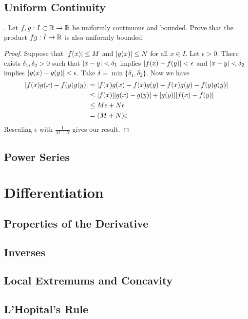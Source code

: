 \documentclass[a4paper]{article}
\begin{document}
\subsection{Uniform Continuity}
\begin{qtn}{}{}
\thetcbcounter.\;\; Let $f,g:I\subset\mathbb{R}\to\mathbb{R}$ be uniformly continuous and bounded. Prove that the product $fg:I\to\mathbb{R}$ is also uniformly bounded. \\\hspace*{\fill}\cite{R0004}\tcbline
\begin{proof}
Suppose that $\abs{f(x)}\leq M$ and $\abs{g(x)}\leq N$ for all $x\in I$. Let $\epsilon>0$. There exists $\delta_1,\delta_2>0$ such that $\abs{x-y}<\delta_1$ implies $\abs{f(x)-f(y)}<\epsilon$ and $\abs{x-y}<\delta_2$ implies $\abs{g(x)-g(y)}<\epsilon$. Take $\delta=\min\{\delta_1,\delta_2\}$. Now we have 
\begin{align*}
\abs{f(x)g(x)-f(y)g(y)}&=\abs{f(x)g(x)-f(x)g(y)+f(x)g(y)-f(y)g(y)}\\
&\leq\abs{f(x)}\abs{g(x)-g(y)}+\abs{g(y)}\abs{f(x)-f(y)}\\
&\leq M\epsilon+N\epsilon\\
&=(M+N)\epsilon
\end{align*}
Rescaling $\epsilon$ with $\frac{1}{M+N}$ gives our result. 
\end{proof}
\end{qtn}

\subsection{Power Series}
\pagebreak
\section{Differentiation}
\subsection{Properties of the Derivative}
\subsection{Inverses}
\subsection{Local Extremums and Concavity}
\subsection{L'Hopital's Rule}
\end{document}
